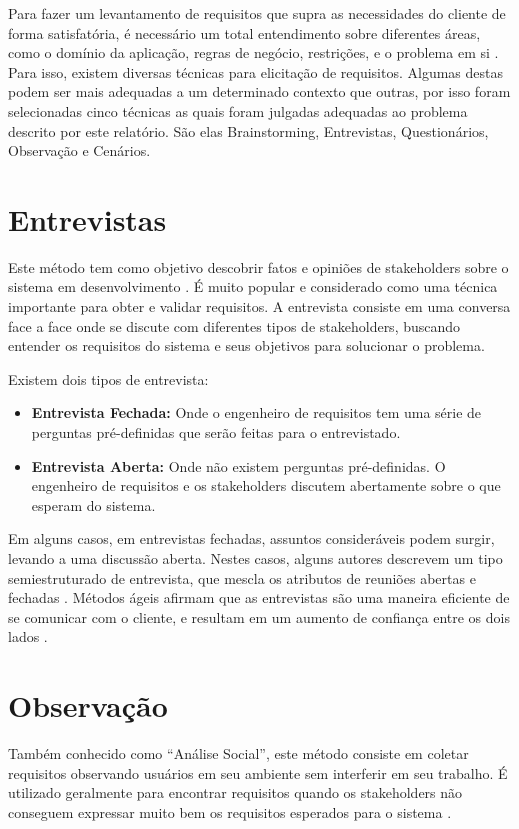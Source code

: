 	Para fazer um levantamento de requisitos que supra as necessidades do cliente de forma satisfatória, é necessário um total
	entendimento sobre diferentes áreas, como o domínio da aplicação, regras de negócio, restrições, e o problema em si
	\cite{paetsch2003}. Para isso, existem diversas técnicas para elicitação de requisitos. Algumas destas podem ser mais adequadas
	 a um determinado contexto que outras, por isso foram selecionadas cinco técnicas as quais foram julgadas adequadas ao
	  problema descrito por este relatório. São elas Brainstorming, Entrevistas, Questionários, Observação e Cenários.

\section{Entrevistas}
Este método tem como objetivo descobrir fatos e opiniões de stakeholders sobre o sistema em desenvolvimento \cite{paetsch2003}.
 É muito popular e considerado como uma técnica importante para obter e validar requisitos. A entrevista consiste em uma
 conversa face a face onde se discute com diferentes tipos de stakeholders, buscando entender os requisitos do sistema e seus
 objetivos para solucionar o problema.

Existem dois tipos de entrevista:

\begin{itemize}
	\item \textbf{Entrevista Fechada:} Onde o engenheiro de requisitos tem uma série de perguntas pré-definidas que serão feitas para o
entrevistado.

	\item \textbf{Entrevista Aberta:} Onde não existem perguntas pré-definidas. O engenheiro de requisitos e os stakeholders discutem abertamente
 sobre o que esperam do sistema.
\end{itemize}

Em alguns casos, em entrevistas fechadas, assuntos consideráveis podem surgir, levando a uma discussão aberta. Nestes casos,
alguns autores descrevem um tipo semiestruturado de entrevista, que mescla os atributos de reuniões abertas e fechadas
\cite{yousuf2015}.
Métodos ágeis afirmam que as entrevistas são uma maneira eficiente de se comunicar com o cliente, e resultam em um aumento de
 confiança entre os dois lados \cite{delucia2010}.

 \section{Observação}
Também conhecido como “Análise Social”, este método consiste em coletar requisitos observando usuários em seu ambiente sem
 interferir em seu trabalho. É utilizado geralmente para encontrar requisitos quando os stakeholders não conseguem expressar
  muito bem os requisitos esperados para o sistema \cite{gunda2008}.

